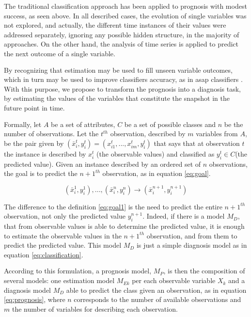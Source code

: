 The traditional classification approach has been applied to prognosis with modest success, as seen above. In all described 
 cases, the evolution of single variables was not explored, and actually, the different time instances of their values were
 addressed separately, ignoring any possible hidden structure, in the majority of approaches. On the other hand, the analysis 
 of time series is applied to predict the next outcome of a single variable.
 
By recognizing that estimation may be used to fill unseen variable outcomes, which in turn may be used to improve classifiers
 accuracy, as in asap classifiers \cite{Antunes2010}. With this purpose, we propose to transform the prognosis into a diagnosis task, by estimating the values of the variables that constitute the snapshot in the future point in time.

Formally, let $A$ be a set of attributes, $C$ be a set of possible classes and $n$ be the number of observations. Let the $t^{th}$ observation,
 described by $m$ variables from $A$, be the pair given by $(\bar{x}_i^t,y_i^t)=(x_{i1}^t,...,x_{im}^t,y_i^t)$ that says that at observation $t$
 the instance is described by $x_i^t$ (the observable values) and classified as $y_i^t \in C$(the predicted value). Given an instance 
 described by an ordered set of $n$ observations, the goal is to predict the ${n+1}^{th}$ observation, as in equation \ref{eq:goal}.

\begin{equation}
	(\bar{x}_i^1,y_i^1 ),...,(\bar{x}_i^n,y_i^n ) \rightarrow (\bar{x}_i^{n+1}, y_i^{n+1})
\label{eq:goal}
\end{equation}

The difference to the definition \ref{eq:goal1} is the need to predict the entire ${n+1}^{th}$ observation, not only the predicted 
value $y_i^{n+1}$. Indeed, if there is a model $M_D$, that from observable values is able to determine the predicted value, it is 
enough to estimate the observable values in the ${n+1}^{th}$ observation, and from them to predict the predicted value. This model $M_D$ is
 just a simple diagnosis model as in equation \ref{eq:classification}.

 According to this formulation, a prognosis model, $M_P$, is then the composition of several models: one estimation model $M_{Ek}$ per each 
 observable variable $X_k$ and a diagnosis model $M_D$ able to predict the class given an observation, as in equation \ref{eq:prognosis}, where $n$ corresponds 
 to the number of available observations and $m$ the number of variables for describing each observation.

